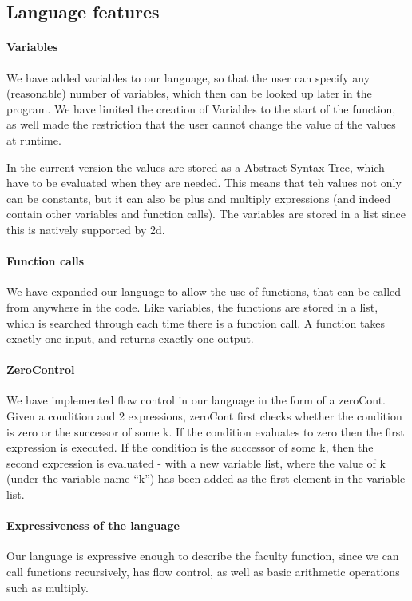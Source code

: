 \subsection{Language features}
\paragraph{Variables}
We have added variables to our language, so that the user can specify any (reasonable) number of variables, which then can be looked up later in the program. We have limited the creation of Variables to the start of the function, as well made the restriction that the user cannot change the value of the values at runtime.

In the current version the values are stored as a Abstract Syntax
Tree, which have to be evaluated when they are needed. This means that
teh values not only can be constants, but it can also be plus and
multiply expressions (and indeed contain other variables and function
calls). The variables are stored in a list since this is natively
supported by 2d.

\paragraph{Function calls}

We have expanded our language to allow the use of functions, that can be called from anywhere in the code. Like variables, the functions are stored in a list, which is searched through each time there is a function call. A function takes exactly one input, and returns exactly one output.

\paragraph{ZeroControl}
We have implemented flow control in our language in the form of a
zeroCont. Given a condition and 2 expressions, zeroCont first checks
whether the condition is zero or the successor of some k. If the
condition evaluates to zero then the first expression is executed. If
the condition is the successor of some k, then the second expression
is evaluated - with a new variable list, where the value of k (under the variable name ``k'') has been added as the first element in the variable list.

\paragraph{Expressiveness of the language}
Our language is expressive enough to describe the faculty function,
since we can call functions recursively, has flow control, as well as
basic arithmetic operations such as multiply. 

